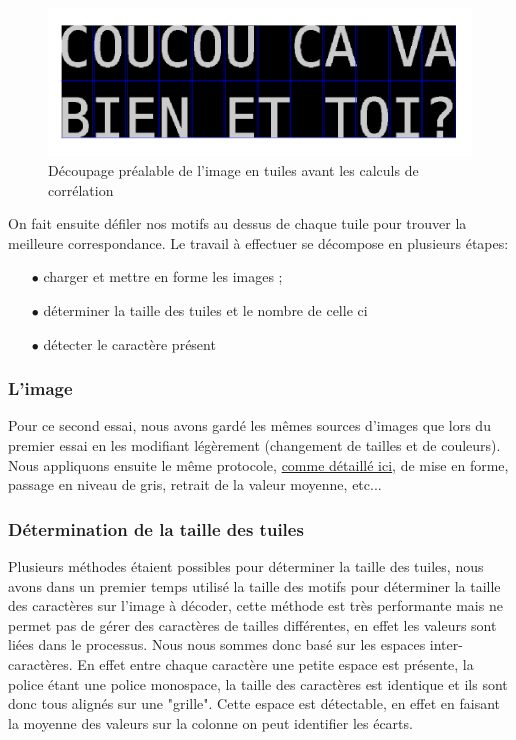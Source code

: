 \documentclass[a4paper,12pt,titlepage]{report}
\begin{document}
	\begin{figure}[h]
		\begin{center}
			\includegraphics[scale=0.4]{../illus/tuiles.png}
		\end{center}
		\vspace{-1em}
		\caption{Découpage préalable de l'image en tuiles avant les calculs de corrélation}
	\end{figure}

	On fait ensuite défiler nos motifs au dessus de chaque tuile pour trouver la meilleure correspondance.
	Le travail à effectuer se décompose en plusieurs étapes:
		\begin{itemize}
			\item[$\bullet$] charger et mettre en forme les images ;
			\item[$\bullet$] déterminer la taille des tuiles et le nombre de celle ci
			\item[$\bullet$] détecter le caractère présent
		\end{itemize}
	\subsubsection{L'image}
	Pour ce second essai, nous avons gardé les mêmes sources d'images que lors du premier essai en les modifiant légèrement (changement de tailles et de couleurs). Nous appliquons ensuite le même protocole, \hyperref[image]{comme détaillé ici}, de mise en forme, passage en niveau de gris, retrait de la valeur moyenne, etc... 
	\subsubsection{Détermination de la taille des tuiles}
	Plusieurs méthodes étaient possibles pour déterminer la taille des tuiles, nous avons dans un premier temps utilisé la taille des motifs pour déterminer la taille des caractères sur l'image à décoder, cette méthode est très performante mais ne permet pas de gérer des caractères de tailles différentes, en effet les valeurs sont liées dans le processus. Nous nous sommes donc basé sur les espaces inter-caractères. En effet entre chaque caractère une petite espace est présente, la police étant une police monospace, la taille des caractères est identique et ils sont donc tous alignés sur une "grille". Cette espace est détectable, en effet en faisant la moyenne des valeurs sur la colonne on peut identifier les écarts.
	
\end{document}
